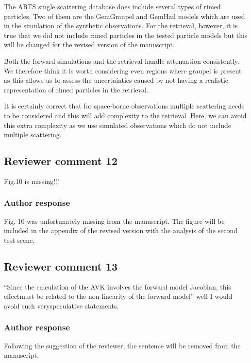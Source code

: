 \documentclass[11pt]{scrartcl}
\begin{document}
The ARTS single scattering database does include several types of rimed
particles. Two of them are the GemGraupel and GemHail models which are used in
the simulation of the synthetic observations. For the retrieval, however, it is
true that we did not include rimed particles in the tested particle models but this
will be changed for the revised version of the manuscript.

Both the forward simulations and the retrieval handle attenuation consistently.
We therefore think it is worth considering even regions where graupel is present
as this allows us to assess the uncertainties caused by not having a realistic
representation of rimed particles in the retrieval.

It is certainly correct that for space-borne observations multiple scattering
needs to be considered and this will add complexity to the retrieval. Here, we
can avoid this extra complexity as we use simulated observations which do not
include multiple scattering.

\subsection*{Reviewer comment 12}

Fig.10 is missing!!!

\subsubsection*{Author response}

Fig. 10 was unfortunately missing from the manuscript. The figure will be included in the appendix
of the revised version with the analysis of the second test scene.

\subsection*{Reviewer comment 13}
 “Since the calculation of the AVK involves the forward model Jacobian, this effectmust be related to the non-linearity of the forward model” well I would avoid such veryspeculative statements.

\subsubsection*{Author response}

Following the suggestion of the reviewer, the sentence will be removed from the manuscript.
\end{document}
